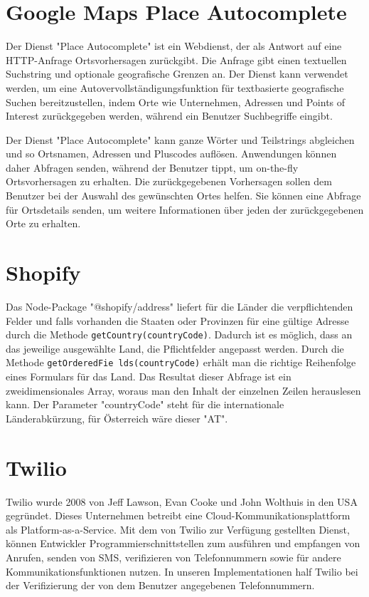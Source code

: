 \section{Google Maps Place Autocomplete}

Der Dienst "Place Autocomplete" ist ein Webdienst, der als Antwort auf eine HTTP-Anfrage Ortsvorhersagen zurückgibt. Die Anfrage gibt einen textuellen Suchstring und optionale geografische Grenzen an. Der Dienst kann verwendet werden, um eine Autovervollständigungsfunktion für textbasierte geografische Suchen bereitzustellen, indem Orte wie Unternehmen, Adressen und Points of Interest zurückgegeben werden, während ein Benutzer Suchbegriffe eingibt.\cite{googlePlacesAPI}

Der Dienst "Place Autocomplete" kann ganze Wörter und Teilstrings abgleichen und so Ortsnamen, Adressen und Pluscodes auflösen. Anwendungen können daher Abfragen senden, während der Benutzer tippt, um on-the-fly Ortsvorhersagen zu erhalten. Die zurückgegebenen Vorhersagen sollen dem Benutzer bei der Auswahl des gewünschten Ortes helfen. Sie können eine Abfrage für Ortsdetails senden, um weitere Informationen über jeden der zurückgegebenen Orte zu erhalten.\cite{googlePlacesAPI}

\section{Shopify}
Das Node-Package "@shopify/address" liefert für die Länder die verpflichtenden Felder und falls vorhanden die Staaten oder Provinzen für eine gültige Adresse durch die Methode \texttt{getCountry(countryCode)}. Dadurch ist es möglich, dass an das jeweilige ausgewählte Land, die Pflichtfelder angepasst werden. Durch die Methode \texttt{getOrderedFie lds(countryCode)} erhält man die richtige Reihenfolge eines Formulars für das Land. Das Resultat dieser Abfrage ist ein zweidimensionales Array, woraus man den Inhalt der einzelnen Zeilen herauslesen kann. Der Parameter "countryCode" steht für die internationale Länderabkürzung, für Österreich wäre dieser "AT". \autocite{shopifyNPM}

\section{Twilio} \label{sec:twilio}
Twilio wurde 2008 von Jeff Lawson, Evan Cooke und John Wolthuis in den USA gegründet. Dieses Unternehmen betreibt eine Cloud-Kommunikationsplattform als Platform-as-a-Service. Mit dem von Twilio zur Verfügung gestellten Dienst, können Entwickler Programmierschnittstellen zum ausführen und empfangen von Anrufen, senden von SMS, verifizieren von Telefonnummern sowie für andere Kommunikationsfunktionen nutzen. In unseren Implementationen half Twilio bei der Verifizierung der von dem Benutzer angegebenen Telefonnummern. \cite{twilioWebsite}

